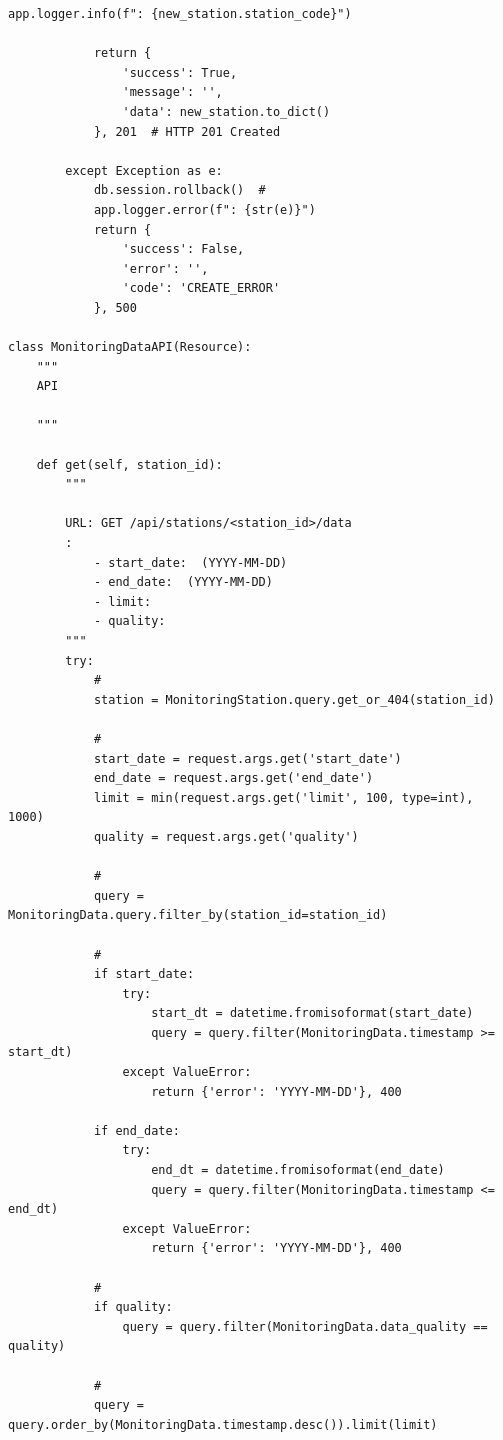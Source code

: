 \begin{lstlisting}[style=python]
            app.logger.info(f": {new_station.station_code}")
            
            return {
                'success': True,
                'message': '',
                'data': new_station.to_dict()
            }, 201  # HTTP 201 Created
            
        except Exception as e:
            db.session.rollback()  # 
            app.logger.error(f": {str(e)}")
            return {
                'success': False,
                'error': '',
                'code': 'CREATE_ERROR'
            }, 500

class MonitoringDataAPI(Resource):
    """
    API
    
    """
    
    def get(self, station_id):
        """

        URL: GET /api/stations/<station_id>/data
        :
            - start_date:  (YYYY-MM-DD)
            - end_date:  (YYYY-MM-DD)
            - limit: 
            - quality: 
        """
        try:
            # 
            station = MonitoringStation.query.get_or_404(station_id)
            
            # 
            start_date = request.args.get('start_date')
            end_date = request.args.get('end_date')
            limit = min(request.args.get('limit', 100, type=int), 1000)
            quality = request.args.get('quality')
            
            # 
            query = MonitoringData.query.filter_by(station_id=station_id)
            
            # 
            if start_date:
                try:
                    start_dt = datetime.fromisoformat(start_date)
                    query = query.filter(MonitoringData.timestamp >= start_dt)
                except ValueError:
                    return {'error': 'YYYY-MM-DD'}, 400
            
            if end_date:
                try:
                    end_dt = datetime.fromisoformat(end_date)
                    query = query.filter(MonitoringData.timestamp <= end_dt)
                except ValueError:
                    return {'error': 'YYYY-MM-DD'}, 400
            
            # 
            if quality:
                query = query.filter(MonitoringData.data_quality == quality)
            
            # 
            query = query.order_by(MonitoringData.timestamp.desc()).limit(limit)
            

\end{lstlisting}
